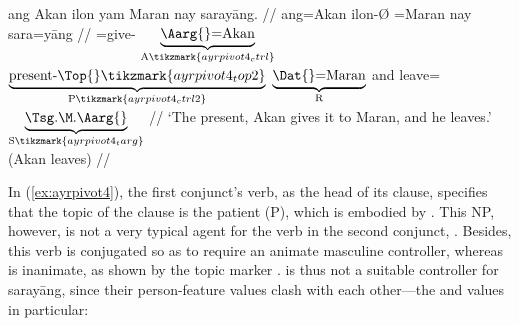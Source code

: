 \ex\label{ex:ayrpivot4}\begingl[aboveglcskip=1.5em, aboveglftskip=2.5em]
	 {ang Akan} ilon {yam Maran} nay sarayāng. //
	 {ang=Akan} ilon-Ø {\Dat{}=Maran} nay sara=yāng //
	\glc \PatTI{}=give-\TsgM{}
		$\underbrace{\text{\Aarg{}=Akan}}_{\text{A}\tikzmark{ayrpivot4_ctrl}}$
		$\underbrace{\text{\smash{present}-\Top{}}\tikzmark{ayrpivot4_top2}}_%
			{\text{P}\tikzmark{ayrpivot4_ctrl2}}$
		$\underbrace{\text{\Dat{}=Maran}}_{\text{R}}$
		and
		leave=$\underbrace{\text{\smash{\TsgM{}}.\Aarg{}}}_%
			{\text{S}\tikzmark{ayrpivot4_targ}}$
		//
	\glft `The present, Akan gives it to Maran, and he leaves.' 
		(Akan leaves) //
\endgl
{}
\xe

In (\ref{ex:ayrpivot4}), the first conjunct's verb, as the head of its clause,
specifies that the topic of the clause is the patient (P), which is embodied by
. This NP, however, is not a very typical agent for
the verb in the second conjunct, . Besides, this verb
is conjugated so as to require an animate masculine controller, whereas
 is inanimate, as shown by the topic marker .
 is thus not a suitable controller for 
{sarayāng}, since their person-feature values clash with each other---the 
\Anim{} and \Gend{} values in particular:

